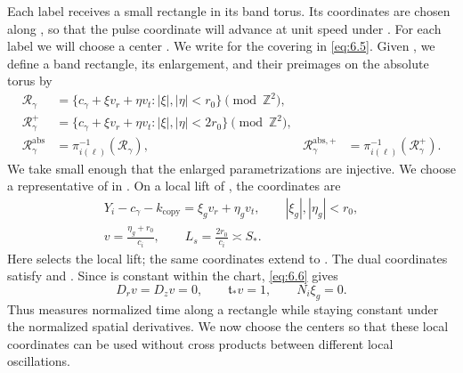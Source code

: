 Each label receives a small rectangle in its band torus. Its coordinates are chosen along , so that the pulse coordinate will advance at unit speed under . For each label we will choose a center . We write  for the covering in \eqref{eq:6.5}. Given , we define a band rectangle, its enlargement, and their preimages on the absolute torus by
\begin{equation}
\begin{aligned}
 \mathcal R_\gamma
 &=\{c_\gamma+\xi v_r+\eta v_t:|\xi|,|\eta|<r_0\}\pmod{\mathbb Z^2},\\
 \mathcal R_\gamma^+
 &=\{c_\gamma+\xi v_r+\eta v_t:|\xi|,|\eta|<2r_0\}\pmod{\mathbb Z^2},\\
 \mathcal R_\gamma^{\mathrm{abs}}
 &=\pi_{i(\ell)}^{-1}(\mathcal R_\gamma),
 &\mathcal R_\gamma^{\mathrm{abs},+}
 &=\pi_{i(\ell)}^{-1}(\mathcal R_\gamma^+).
\end{aligned}
\tag{6.10}\label{eq:6.10}
\end{equation}
We take  small enough that the enlarged parametrizations are injective. We choose a representative of  in . On a local lift of , the coordinates are
\begin{equation}
\begin{gathered}
 Y_i-c_\gamma-k_{\mathrm{copy}}=\xi_gv_r+\eta_gv_t,
 \qquad |\xi_g|,|\eta_g|<r_0,\\
 v=\frac{\eta_g+r_0}{c_i},
 \qquad
 L_s=\frac{2r_0}{c_i}\asymp S_*.
\end{gathered}
\tag{6.11}\label{eq:6.11}
\end{equation}
Here  selects the local lift; the same coordinates extend to . The dual coordinates satisfy  and . Since  is constant within the chart, \eqref{eq:6.6} gives
\begin{equation}
 D_rv=D_zv=0,
 \qquad \mathfrak t_*v=1,
 \qquad N_i\xi_g=0.
 \tag{6.12}\label{eq:6.12}
\end{equation}
Thus  measures normalized time along a rectangle while staying constant under the normalized spatial derivatives. We now choose the centers so that these local coordinates can be used without cross products between different local oscillations.

